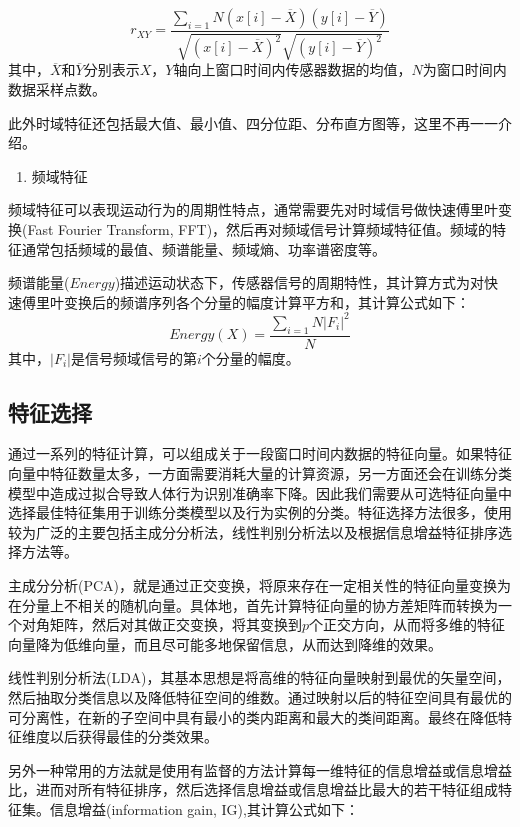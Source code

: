 \begin{equation}
	r_{XY} = \frac{\sum_{i=1}{N}(x[i] - \overline{X})(y[i] - \overline{Y})}{\sqrt{(x[i] - \overline{X})^2}\sqrt{(y[i] - \overline{Y})^2}}
\end{equation}
其中，$\overline{X}$和$\overline{Y}$分别表示$X$，$Y$轴向上窗口时间内传感器数据的均值，$N$为窗口时间内数据采样点数。
\par 此外时域特征还包括最大值、最小值、四分位距、分布直方图等，这里不再一一介绍。

\begin{enumerate}[(2)]
	\item 频域特征
\end{enumerate}
\par 频域特征可以表现运动行为的周期性特点，通常需要先对时域信号做快速傅里叶变换(Fast Fourier Transform, FFT)，然后再对频域信号计算频域特征值。频域的特征通常包括频域的最值、频谱能量、频域熵、功率谱密度等。
\par 频谱能量($Energy$)描述运动状态下，传感器信号的周期特性，其计算方式为对快速傅里叶变换后的频谱序列各个分量的幅度计算平方和，其计算公式如下：
\begin{equation}
	Energy(X) = \frac{\sum_{i=1}{N}|F_i|^2}{N}
\end{equation}
其中，$|F_i|$是信号频域信号的第$i$个分量的幅度。

\subsection{特征选择}
\par 通过一系列的特征计算，可以组成关于一段窗口时间内数据的特征向量。如果特征向量中特征数量太多，一方面需要消耗大量的计算资源，另一方面还会在训练分类模型中造成过拟合导致人体行为识别准确率下降。因此我们需要从可选特征向量中选择最佳特征集用于训练分类模型以及行为实例的分类。特征选择方法很多，使用较为广泛的主要包括主成分分析法，线性判别分析法以及根据信息增益特征排序选择方法等。
\par 主成分分析(PCA)，就是通过正交变换，将原来存在一定相关性的特征向量变换为在分量上不相关的随机向量。具体地，首先计算特征向量的协方差矩阵而转换为一个对角矩阵，然后对其做正交变换，将其变换到$p$个正交方向，从而将多维的特征向量降为低维向量，而且尽可能多地保留信息，从而达到降维的效果。
\par 线性判别分析法(LDA)，其基本思想是将高维的特征向量映射到最优的矢量空间，然后抽取分类信息以及降低特征空间的维数。通过映射以后的特征空间具有最优的可分离性，在新的子空间中具有最小的类内距离和最大的类间距离。最终在降低特征维度以后获得最佳的分类效果。
\par 另外一种常用的方法就是使用有监督的方法计算每一维特征的信息增益或信息增益比，进而对所有特征排序，然后选择信息增益或信息增益比最大的若干特征组成特征集。信息增益(information gain, IG),其计算公式如下：

